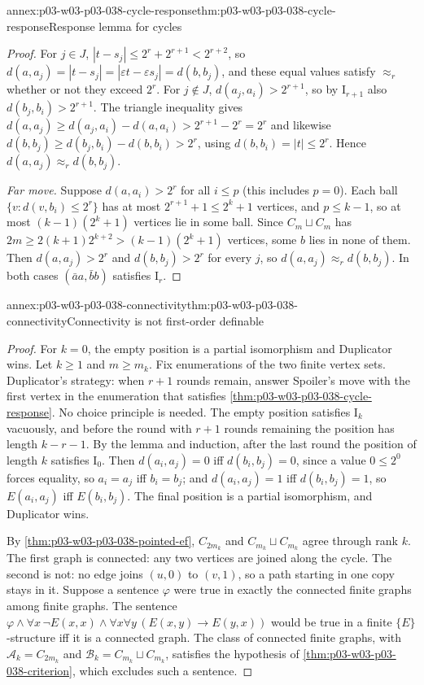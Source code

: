 \begin{annexitem}{annex:p03-w03-p03-038-cycle-response}{thm:p03-w03-p03-038-cycle-response}{Response lemma for cycles}
\begin{proof}
For \(j\in J\), \(|t-s_j|\le2^r+2^{r+1}<2^{r+2}\), so
\(d(a,a_j)=|t-s_j|=|\varepsilon t-\varepsilon s_j|=d(b,b_j)\), and these equal
values satisfy \(\approx_r\) whether or not they exceed \(2^r\). For
\(j\notin J\), \(d(a_j,a_i)>2^{r+1}\), so by \(\mathrm I_{r+1}\) also
\(d(b_j,b_i)>2^{r+1}\). The triangle inequality gives
\(d(a,a_j)\ge d(a_j,a_i)-d(a,a_i)>2^{r+1}-2^r=2^r\) and likewise
\(d(b,b_j)\ge d(b_j,b_i)-d(b,b_i)>2^r\), using \(d(b,b_i)=|t|\le2^r\). Hence
\(d(a,a_j)\approx_rd(b,b_j)\).

\emph{Far move.} Suppose \(d(a,a_i)>2^r\) for all \(i\le p\) (this includes
\(p=0\)). Each ball \(\{v:d(v,b_i)\le2^r\}\) has at most \(2^{r+1}+1\le2^k+1\)
vertices, and \(p\le k-1\), so at most \((k-1)(2^k+1)\) vertices lie in some
ball. Since \(C_m\sqcup C_m\) has \(2m\ge2(k+1)2^{k+2}>(k-1)(2^k+1)\) vertices,
some \(b\) lies in none of them. Then \(d(a,a_j)>2^r\) and \(d(b,b_j)>2^r\) for
every \(j\), so \(d(a,a_j)\approx_rd(b,b_j)\). In both cases
\((\bar aa,\bar bb)\) satisfies \(\mathrm I_r\).
\end{proof}
\end{annexitem}

\begin{annexitem}{annex:p03-w03-p03-038-connectivity}{thm:p03-w03-p03-038-connectivity}{Connectivity is not first-order definable}
\begin{proof}
For \(k=0\), the empty position is a partial isomorphism and Duplicator wins.
Let \(k\ge1\) and \(m\ge m_k\). Fix enumerations of the two finite vertex sets.
Duplicator's strategy: when \(r+1\) rounds remain, answer Spoiler's move with
the first vertex in the enumeration that satisfies
\cref{thm:p03-w03-p03-038-cycle-response}. No choice principle is needed. The
empty position satisfies \(\mathrm I_k\) vacuously, and before the round with
\(r+1\) rounds remaining the position has length \(k-r-1\). By the lemma and
induction, after the last round the position of length \(k\) satisfies
\(\mathrm I_0\). Then \(d(a_i,a_j)=0\) iff \(d(b_i,b_j)=0\), since a value
\(0\le2^0\) forces equality, so \(a_i=a_j\) iff \(b_i=b_j\); and
\(d(a_i,a_j)=1\) iff \(d(b_i,b_j)=1\), so \(E(a_i,a_j)\) iff \(E(b_i,b_j)\). The
final position is a partial isomorphism, and Duplicator wins.

By \cref{thm:p03-w03-p03-038-pointed-ef}, \(C_{2m_k}\) and
\(C_{m_k}\sqcup C_{m_k}\) agree through rank \(k\). The first graph is
connected: any two vertices are joined along the cycle. The second is not:
no edge joins \((u,0)\) to \((v,1)\), so a path starting in one copy stays in
it. Suppose a sentence \(\varphi\) were true in exactly the connected finite
graphs among finite graphs. The sentence
\(\varphi\wedge\forall x\,\neg E(x,x)\wedge
\forall x\forall y\,(E(x,y)\to E(y,x))\) would be true in a finite
\(\{E\}\)-structure iff it is a connected graph. The class of connected finite
graphs, with \(\mathcal A_k=C_{2m_k}\) and
\(\mathcal B_k=C_{m_k}\sqcup C_{m_k}\), satisfies the hypothesis of
\cref{thm:p03-w03-p03-038-criterion}, which excludes such a sentence.
\end{proof}
\end{annexitem}

